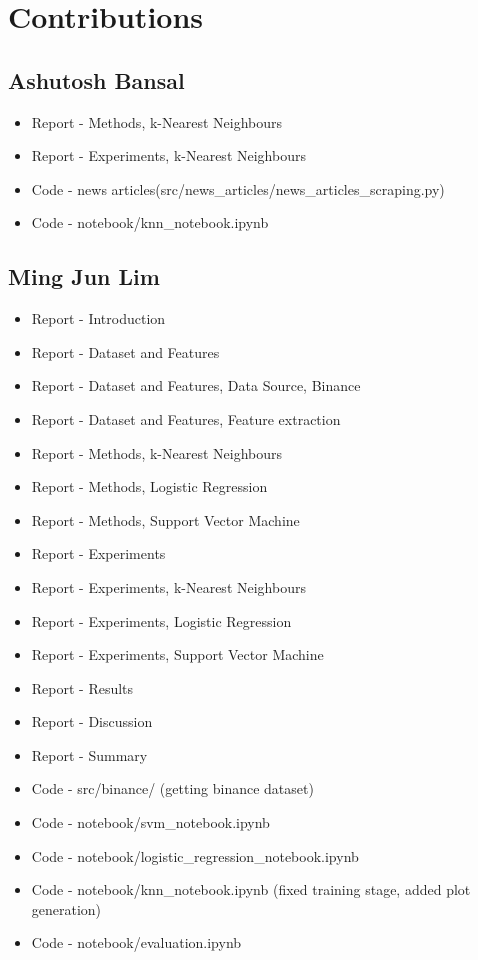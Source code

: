 \documentclass[transmag]{IEEEtran}
\begin{document}
\section{Contributions}

\subsection{Ashutosh Bansal}

\begin{itemize}
  \item Report - Methods, k-Nearest Neighbours
  \item Report - Experiments, k-Nearest Neighbours
  \item Code - news articles(src/news\_articles/news\_articles\_scraping.py)
  \item Code - notebook/knn\_notebook.ipynb
\end{itemize}

\subsection{Ming Jun Lim}
\begin{itemize}
  \item Report - Introduction
  \item Report - Dataset and Features
  \item Report - Dataset and Features, Data Source, Binance
  \item Report - Dataset and Features, Feature extraction
  \item Report - Methods, k-Nearest Neighbours
  \item Report - Methods, Logistic Regression
  \item Report - Methods, Support Vector Machine
  \item Report - Experiments
  \item Report - Experiments, k-Nearest Neighbours
  \item Report - Experiments, Logistic Regression
  \item Report - Experiments, Support Vector Machine
  \item Report - Results
  \item Report - Discussion
  \item Report - Summary  
  \item Code - src/binance/ (getting binance dataset)
  \item Code - notebook/svm\_notebook.ipynb
  \item Code - notebook/logistic\_regression\_notebook.ipynb
  \item Code - notebook/knn\_notebook.ipynb (fixed training stage, added plot generation)
  \item Code - notebook/evaluation.ipynb  
\end{itemize}
\end{document}
